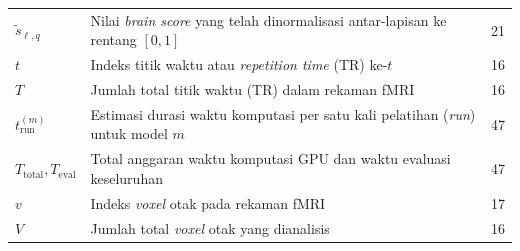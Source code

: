 \begin{longtable}{@{} l >{\raggedright\arraybackslash}p{6.5cm} c @{}}
$\tilde{s}_{\ell,q}$ & Nilai \textit{brain score} yang telah dinormalisasi antar-lapisan ke rentang $[0, 1]$ & 21 \\
$t$ & Indeks titik waktu atau \textit{repetition time} (TR) ke-$t$ & 16 \\
$T$ & Jumlah total titik waktu (TR) dalam rekaman fMRI & 16 \\
$t_{\text{run}}^{(m)}$ & Estimasi durasi waktu komputasi per satu kali pelatihan (\textit{run}) untuk model $m$ & 47 \\
$T_{\text{total}}, T_{\text{eval}}$ & Total anggaran waktu komputasi GPU dan waktu evaluasi keseluruhan & 47 \\
$v$ & Indeks \textit{voxel} otak pada rekaman fMRI & 17 \\
$V$ & Jumlah total \textit{voxel} otak yang dianalisis & 16 \\[1ex]


\end{longtable}
